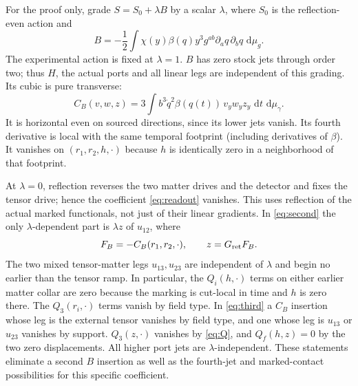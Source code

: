 \documentclass[11pt]{article}
\newcommand{\dd}{\,\mathrm d}
\newcommand{\Rret}{G_{\rm ret}}
\numberwithin{equation}{section}
\begin{document}
For the proof only, grade $S=S_0+\lambda B$ by a scalar $\lambda$, where $S_0$ is the reflection-even action and
\[
 B=-\frac12\int\chi(y)\beta(q)y^3 g^{ab}\partial_aq\,\partial_bq\,\dd\mu_g .
\]
The experimental action is fixed at $\lambda=1$. $B$ has zero stock jets through order two; thus $H$, the actual ports and all linear legs are independent of this grading. Its cubic is pure transverse:
\begin{equation}
 C_B(v,w,z)=3\int b^3\dot q^2\beta(q(t))\,v_yw_yz_y\,\dd t\,\dd\mu_\gamma .
 \label{eq:beta}
\end{equation}
It is horizontal even on sourced directions, since its lower jets vanish. Its fourth derivative is local with the same temporal footprint (including derivatives of $\beta$). It vanishes on $(r_1,r_2,h,\cdot)$ because $h$ is identically zero in a neighborhood of that footprint.

At $\lambda=0$, reflection reverses the two matter drives and the detector and fixes the tensor drive; hence the coefficient \eqref{eq:readout} vanishes. This uses reflection of the actual marked functionals, not just of their linear gradients. In \eqref{eq:second} the only $\lambda$-dependent part is $\lambda z$ of $u_{12}$, where
\begin{equation}
      F_B=-C_B(r_1,r_2,\cdot),\qquad z=\Rret F_B .
 \label{eq:early}
\end{equation}
The two mixed tensor-matter legs $u_{13},u_{23}$ are independent of $\lambda$ and begin no earlier than the tensor ramp. In particular, the $Q_i(h,\cdot)$ terms on either earlier matter collar are zero because the marking is cut-local in time and $h$ is zero there. The $Q_3(r_i,\cdot)$ terms vanish by field type. In \eqref{eq:third} a $C_B$ insertion whose leg is the external tensor vanishes by field type, and one whose leg is $u_{13}$ or $u_{23}$ vanishes by support. $Q_3(z,\cdot)$ vanishes by \eqref{eq:Q}, and $Q_f(h,z)=0$ by the two zero displacements. All higher port jets are $\lambda$-independent. These statements eliminate a second $B$ insertion as well as the fourth-jet and marked-contact possibilities for this specific coefficient.
\end{document}
